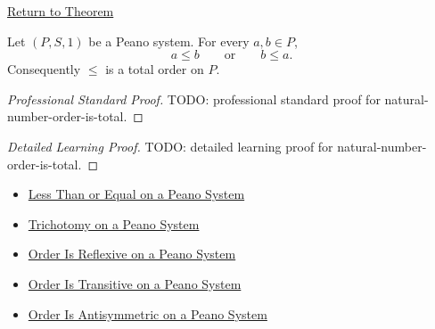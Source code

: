 \newpage
{}
\label{prf:natural-number-order-is-total}

\begin{remark*}[Return]
\hyperref[thm:natural-number-order-is-total]{Return to Theorem}
\end{remark*}

\begin{theorem*}
Let $(P,S,1)$ be a Peano system. For every $a,b \in P$,
\[
a \le b
\qquad\text{or}\qquad
b \le a.
\]
Consequently $\le$ is a total order on $P$.
\end{theorem*}

\begin{proof}[Professional Standard Proof]
\LRAProofBodyStart
TODO: professional standard proof for natural-number-order-is-total.
\end{proof}

\begin{proof}[Detailed Learning Proof]
\LRAProofBodyStart
TODO: detailed learning proof for natural-number-order-is-total.
\end{proof}

\begin{remark*}
\end{remark*}

\begin{dependencies}
\begin{itemize}
  \item \hyperref[def:less-than-or-equal-on-peano-system]{Less Than or Equal on a Peano System}
  \item \hyperref[thm:trichotomy-on-peano-system]{Trichotomy on a Peano System}
  \item \hyperref[thm:order-reflexive-on-peano-system]{Order Is Reflexive on a Peano System}
  \item \hyperref[thm:order-transitive-on-peano-system]{Order Is Transitive on a Peano System}
  \item \hyperref[thm:order-antisymmetric-on-peano-system]{Order Is Antisymmetric on a Peano System}
\end{itemize}
\end{dependencies}

\clearpage
